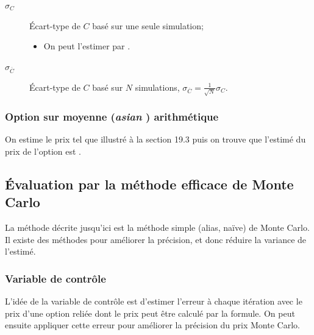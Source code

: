 \documentclass[10pt, french]{article}
\begin{document}
\begin{multicols*}{2}
\begin{distributions}[Notation]
\begin{description}
	\item[$\sigma_{C}$]	Écart-type de $C$ basé sur une seule simulation;
		\begin{itemize}
		\item	On peut l'estimer par .
		\end{itemize}
	\item[$\sigma_{\overline{C}}$]	Écart-type de $C$ basé sur $N$ simulations, $\sigma_{\overline{C}}	=	\frac{1}{\sqrt{N}}\sigma_{C}$.
\end{description}
\end{distributions}

\subsubsection*{Option sur moyenne (\og \textit{asian} \fg{}) arithmétique}
On estime le prix tel que illustré à la section 19.3 puis on trouve que l'estimé du prix de l'option est .


\columnbreak
\subsection{Évaluation par la méthode efficace de Monte Carlo}
La méthode décrite jusqu'ici est la méthode simple (alias, naïve) de Monte Carlo. Il existe des méthodes pour améliorer la précision, et donc réduire la variance de l'estimé.

\subsubsection*{Variable de contrôle}
L'idée de la variable de contrôle est d'estimer l'erreur à chaque itération avec le prix d'une option reliée dont le prix peut être calculé par la formule. On peut ensuite appliquer cette erreur pour améliorer la précision du prix Monte Carlo.


\end{multicols*}
\end{document}
